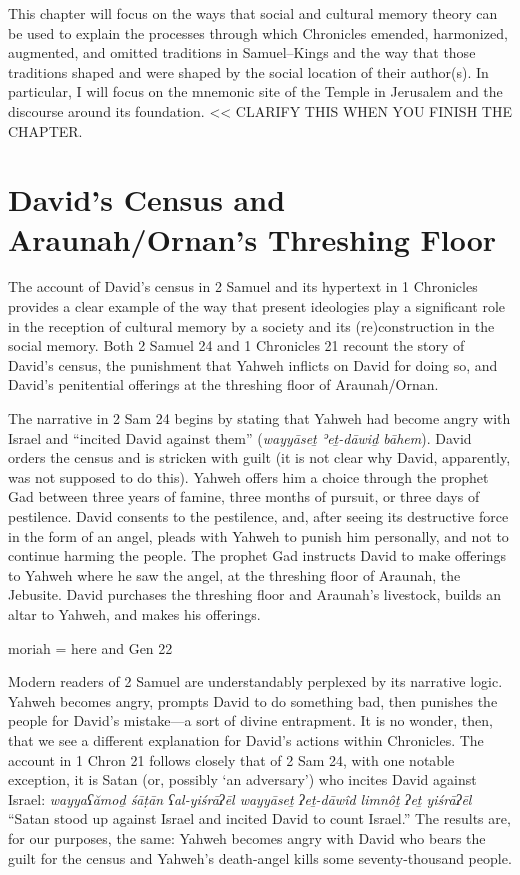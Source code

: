 This chapter will focus on the ways that social and cultural memory
theory can be used to explain the processes through which Chronicles
emended, harmonized, augmented, and omitted traditions in Samuel--Kings
and the way that those traditions shaped and were shaped by the social
location of their author(s). In particular, I will focus on the mnemonic
site of the Temple in Jerusalem and the discourse around its foundation.
\textless{}\textless{} CLARIFY THIS WHEN YOU FINISH THE CHAPTER.

\section{David's Census and Araunah/Ornan's Threshing
Floor}\label{davids-census-and-araunahornans-threshing-floor}

The account of David's census in 2 Samuel and its hypertext in 1
Chronicles provides a clear example of the way that present ideologies
play a significant role in the reception of cultural memory by a society
and its (re)construction in the social memory. Both 2 Samuel 24 and 1
Chronicles 21 recount the story of David's census, the punishment that
Yahweh inflicts on David for doing so, and David's penitential offerings
at the threshing floor of Araunah/Ornan.

The narrative in 2 Sam 24 begins by stating that Yahweh had become angry
with Israel and ``incited David against them'' (\emph{wayyāseṯ ʾeṯ-dāwiḏ
bāhem}). David orders the census and is stricken with guilt (it is not
clear why David, apparently, was not supposed to do this). Yahweh offers
him a choice through the prophet Gad between three years of famine,
three months of pursuit, or three days of pestilence. David consents to
the pestilence, and, after seeing its destructive force in the form of
an angel, pleads with Yahweh to punish him personally, and not to
continue harming the people. The prophet Gad instructs David to make
offerings to Yahweh where he saw the angel, at the threshing floor of
Araunah, the Jebusite. David purchases the threshing floor and Araunah's
livestock, builds an altar to Yahweh, and makes his offerings.

moriah = here and Gen 22

Modern readers of 2 Samuel are understandably perplexed by its narrative
logic. Yahweh becomes angry, prompts David to do something bad, then
punishes the people for David's mistake---a sort of divine entrapment.
It is no wonder, then, that we see a different explanation for David's
actions within Chronicles. The account in 1 Chron 21 follows closely
that of 2 Sam 24, with one notable exception, it is Satan (or, possibly
`an adversary') who incites David against Israel: \emph{wayyaʕămoḏ śāṭān
ʕal-yiśrāʔēl wayyāseṯ ʔeṯ-dāwîd limnôṯ ʔeṯ yiśrāʔēl} ``Satan stood up
against Israel and incited David to count Israel.'' The results are, for
our purposes, the same: Yahweh becomes angry with David who bears the
guilt for the census and Yahweh's death-angel kills some
seventy-thousand people.

